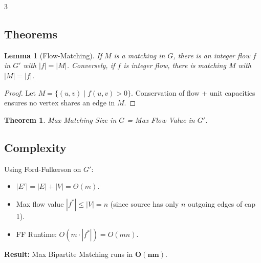 \documentclass[a4paper,10pt]{article}
\newtheorem*{theorem}{Theorem}
\newtheorem*{lemma}{Lemma}
\begin{document}
\begin{multicols}{3}
\subsection{Theorems}
\begin{lemma}[Flow-Matching]
If $M$ is a matching in $G$, there is an integer flow $f$ in $G'$ with $|f|=|M|$. Conversely, if $f$ is integer flow, there is matching $M$ with $|M|=|f|$.
\end{lemma}
\begin{proof}
Let $M = \{ (u,v) \mid f(u,v) > 0 \}$. Conservation of flow + unit capacities ensures no vertex shares an edge in $M$.
\end{proof}

\begin{theorem}
Max Matching Size in $G$ = Max Flow Value in $G'$.
\end{theorem}

\subsection{Complexity}
Using Ford-Fulkerson on $G'$:
\begin{itemize}
    \item $|E'| = |E| + |V| = \Theta(m)$.
    \item Max flow value $|f^*| \le |V| = n$ (since source has only $n$ outgoing edges of cap 1).
    \item FF Runtime: $O(m \cdot |f^*|) = O(mn)$.
\end{itemize}
\textbf{Result:} Max Bipartite Matching runs in $\mathbf{O(nm)}$.

\end{multicols}
\end{document}
